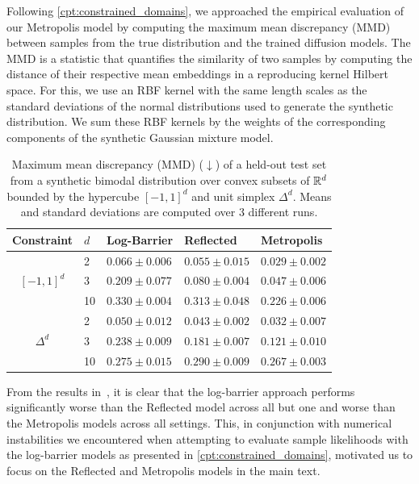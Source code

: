Following \cref{cpt:constrained_domains}, we approached the empirical evaluation of our Metropolis model by computing the maximum mean discrepancy (MMD) \parencite{gretton2012kernel} between samples from the true distribution and the trained diffusion models.
The MMD is a statistic that quantifies the similarity of two samples by computing the distance of their respective mean embeddings in a reproducing kernel Hilbert space.
For this, we use an RBF kernel with the same length scales as the standard deviations of the normal distributions used to generate the synthetic distribution.
We sum these RBF kernels by the weights of the corresponding components of the synthetic Gaussian mixture model.

\begin{table}[H]
	\caption{
		Maximum mean discrepancy (MMD) ($\downarrow$) of a held-out test set from a synthetic bimodal distribution over convex subsets of $\mathbb{R}^d$ bounded by the hypercube \([-1,1]^d\) and unit simplex \(\Delta^d\).
		Means and standard deviations are computed over 3 different runs.
	}
	\label{tab:synthetic_polytope_mmd}
	\vspace{1em}
	\centering

	\begin{tabular}{cllll}
		\toprule
		Constraint & \(d\) & {Log-Barrier}      & {Reflected}        & {Metropolis}                \\
		\midrule
		\multirow{3}{*}{$[-1,1]^d$}
		           & 2     & $0.066 \pm{0.006}$ & $0.055 \pm{0.015}$ & $\mathbf{0.029 \pm{0.002}}$ \\
		           & 3     & $0.209 \pm{0.077}$ & $0.080 \pm{0.004}$ & $\mathbf{0.047 \pm{0.006}}$ \\
		           & 10    & $0.330 \pm{0.004}$ & $0.313 \pm{0.048}$ & $\mathbf{0.226 \pm{0.006}}$ \\
		\midrule
		\multirow{3}{*}{$\Delta^d$}
		           & 2     & $0.050 \pm{0.012}$ & $0.043 \pm{0.002}$ & $\mathbf{0.032 \pm{0.007}}$ \\
		           & 3     & $0.238 \pm{0.009}$ & $0.181 \pm{0.007}$ & $\mathbf{0.121 \pm{0.010}}$ \\
		           & 10    & $0.275 \pm{0.015}$ & $0.290 \pm{0.009}$ & $\mathbf{0.267 \pm{0.003}}$ \\
		\bottomrule
	\end{tabular}
\end{table}

From the results in~, it is clear that the log-barrier approach performs significantly worse than the Reflected model across all but one and worse than the Metropolis models across all settings.
This, in conjunction with numerical instabilities we encountered when attempting to evaluate sample likelihoods with the log-barrier models as presented in \cref{cpt:constrained_domains}, motivated us to focus on the Reflected and Metropolis models in the main text.

